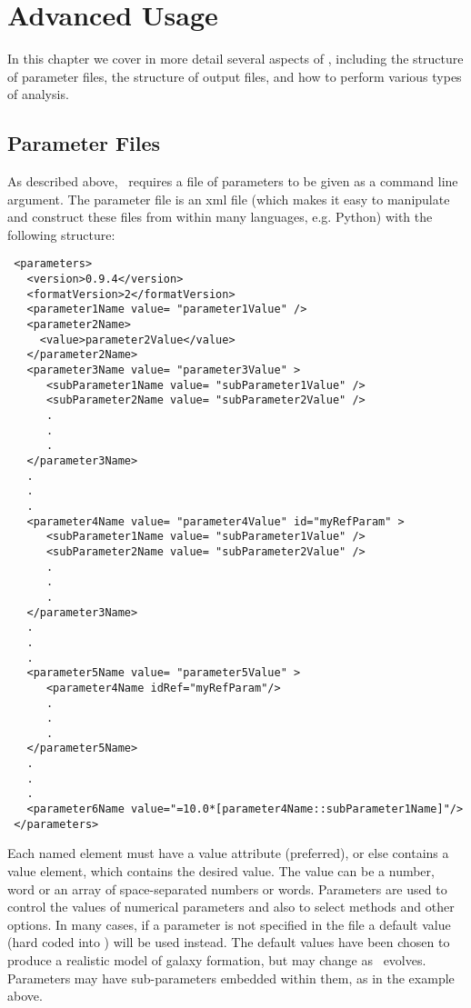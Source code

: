 \chapter{Advanced Usage}

In this chapter we cover in more detail several aspects of \glc, including the structure of parameter files, the structure of output files, and how to perform various types of analysis.

\section{Parameter Files}\label{sec:ParameterFiles}

As described above, \glc\ requires a file of parameters to be given as a command line argument. The parameter file is an \gls{xml} file (which makes it easy to manipulate and construct these files from within many languages, e.g. Python) with the following structure:
\begin{verbatim}
 <parameters>
   <version>0.9.4</version>
   <formatVersion>2</formatVersion>
   <parameter1Name value= "parameter1Value" />
   <parameter2Name>
     <value>parameter2Value</value>
   </parameter2Name>
   <parameter3Name value= "parameter3Value" >
      <subParameter1Name value= "subParameter1Value" />
      <subParameter2Name value= "subParameter2Value" />
      .
      .
      .
   </parameter3Name>
   .
   .
   .
   <parameter4Name value= "parameter4Value" id="myRefParam" >
      <subParameter1Name value= "subParameter1Value" />
      <subParameter2Name value= "subParameter2Value" />
      .
      .
      .
   </parameter3Name>
   .
   .
   .
   <parameter5Name value= "parameter5Value" >
      <parameter4Name idRef="myRefParam"/>
      .
      .
      .
   </parameter5Name>
   .
   .
   .
   <parameter6Name value="=10.0*[parameter4Name::subParameter1Name]"/>
 </parameters>
\end{verbatim}
Each named element must have a {\normalfont \ttfamily value} attribute (preferred), or else contains a value element, which contains the desired value. The value can be a number, word or an array of space-separated numbers or words. Parameters are used to control the values of numerical parameters and also to select methods and other options. In many cases, if a parameter is not specified in the file a default value (hard coded into \glc) will be used instead. The default values have been chosen to produce a realistic model of galaxy formation, but may change as \glc\ evolves. Parameters may have sub-parameters embedded within them, as in the example above.

